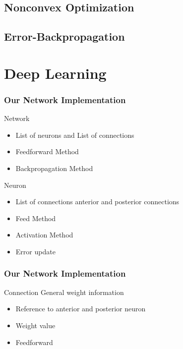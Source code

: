 \documentclass{beamer}
\begin{document}
    \subsection{Nonconvex Optimization}
    \subsection{Error-Backpropagation}

\section{Deep Learning}



\begin{frame}
\frametitle{Our Network Implementation}
\begin{block}{Network}
    \begin{itemize}
        \item List of neurons and List of connections
        \item Feedforward Method
        \item Backpropagation Method
    \end{itemize}
\end{block}

\begin{block}{Neuron}
    \begin{itemize}
        \item List of connections anterior and posterior connections
        \item Feed Method
        \item Activation Method
        \item Error update
    \end{itemize}
\end{block}
\end{frame}


\begin{frame}
\frametitle{Our Network Implementation}
\begin{block}{Connection}
    General weight information
    \begin{itemize}
        \item Reference to anterior and posterior neuron
        \item Weight value
        \item Feedforward
    \end{itemize}
\end{block}
\end{frame}
\end{document}
